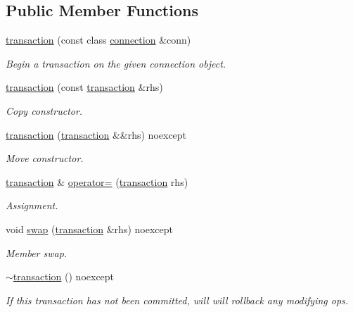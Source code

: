 \subsection*{Public Member Functions}
\begin{DoxyCompactItemize}
\item 
\mbox{\hyperlink{classnanodbc_1_1transaction_a2327256b4198143da5f7c84d64834f5b}{transaction}} (const class \mbox{\hyperlink{classnanodbc_1_1connection}{connection}} \&conn)
\begin{DoxyCompactList}\small\item\em Begin a transaction on the given connection object. \end{DoxyCompactList}\item 
\mbox{\hyperlink{classnanodbc_1_1transaction_ad6550e2168b6914cf5b7409fb07592d7}{transaction}} (const \mbox{\hyperlink{classnanodbc_1_1transaction}{transaction}} \&rhs)
\begin{DoxyCompactList}\small\item\em Copy constructor. \end{DoxyCompactList}\item 
\mbox{\hyperlink{classnanodbc_1_1transaction_a256ea56280c04b0f250749dbdb601eda}{transaction}} (\mbox{\hyperlink{classnanodbc_1_1transaction}{transaction}} \&\&rhs) noexcept
\begin{DoxyCompactList}\small\item\em Move constructor. \end{DoxyCompactList}\item 
\mbox{\hyperlink{classnanodbc_1_1transaction}{transaction}} \& \mbox{\hyperlink{classnanodbc_1_1transaction_a584efaaafeb6e5246db46a45f9ce2e31}{operator=}} (\mbox{\hyperlink{classnanodbc_1_1transaction}{transaction}} rhs)
\begin{DoxyCompactList}\small\item\em Assignment. \end{DoxyCompactList}\item 
void \mbox{\hyperlink{classnanodbc_1_1transaction_ada0f4ab08a0fb530e904306f3eceb32c}{swap}} (\mbox{\hyperlink{classnanodbc_1_1transaction}{transaction}} \&rhs) noexcept
\begin{DoxyCompactList}\small\item\em Member swap. \end{DoxyCompactList}\item 
\mbox{\hyperlink{classnanodbc_1_1transaction_a0da67846a9ff51f1fa5d1f81d4fde0ea}{$\sim$transaction}} () noexcept
\begin{DoxyCompactList}\small\item\em If this transaction has not been committed, will will rollback any modifying ops. \end{DoxyCompactList}\item 

\end{DoxyCompactItemize}
